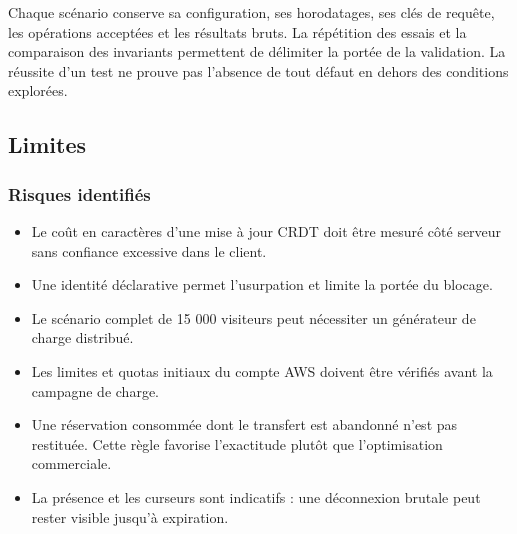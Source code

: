 Chaque scénario conserve sa configuration, ses horodatages, ses clés de requête, les opérations acceptées et les résultats bruts. La répétition des essais et la comparaison des invariants permettent de délimiter la portée de la validation. La réussite d'un test ne prouve pas l'absence de tout défaut en dehors des conditions explorées.

\subsection{Limites}

\subsubsection{Risques identifiés}

\begin{itemize}
\item Le coût en caractères d'une mise à jour CRDT doit être mesuré côté serveur sans confiance excessive dans le client.
\item Une identité déclarative permet l'usurpation et limite la portée du blocage.
\item Le scénario complet de 15 000 visiteurs peut nécessiter un générateur de charge distribué.
\item Les limites et quotas initiaux du compte AWS doivent être vérifiés avant la campagne de charge.
\item Une réservation consommée dont le transfert est abandonné n'est pas restituée. Cette règle favorise l'exactitude plutôt que l'optimisation commerciale.
\item La présence et les curseurs sont indicatifs : une déconnexion brutale peut rester visible jusqu'à expiration.
\end{itemize}
